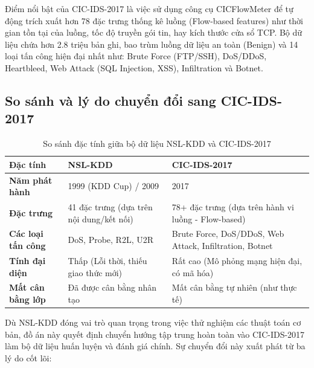 \documentclass[../DoAn.tex]{subfiles}
\begin{document}
Điểm nổi bật của CIC-IDS-2017 là việc sử dụng công cụ CICFlowMeter để tự động trích xuất hơn 78 đặc trưng thống kê luồng (Flow-based features) như thời gian tồn tại của luồng, tốc độ truyền gói tin, hay kích thước cửa sổ TCP. Bộ dữ liệu chứa hơn 2.8 triệu bản ghi, bao trùm luồng dữ liệu an toàn (Benign) và 14 loại tấn công hiện đại nhất như: Brute Force (FTP/SSH), DoS/DDoS, Heartbleed, Web Attack (SQL Injection, XSS), Infiltration và Botnet.

\subsection{So sánh và lý do chuyển đổi sang CIC-IDS-2017}

\begin{table}[htbp]
\centering
\caption{So sánh đặc tính giữa bộ dữ liệu NSL-KDD và CIC-IDS-2017}
\label{tab:dataset_comparison}
\begin{tabular}{|p{3.5cm}|p{5cm}|p{5.5cm}|}
\hline
\textbf{Đặc tính} & \textbf{NSL-KDD} & \textbf{CIC-IDS-2017} \\
\hline
\textbf{Năm phát hành} & 1999 (KDD Cup) / 2009 & 2017 \\
\hline
\textbf{Đặc trưng} & 41 đặc trưng (dựa trên nội dung/kết nối) & 78+ đặc trưng (dựa trên hành vi luồng - Flow-based) \\
\hline
\textbf{Các loại tấn công} & DoS, Probe, R2L, U2R & Brute Force, DoS/DDoS, Web Attack, Infiltration, Botnet \\
\hline
\textbf{Tính đại diện} & Thấp (Lỗi thời, thiếu giao thức mới) & Rất cao (Mô phỏng mạng hiện đại, có mã hóa) \\
\hline
\textbf{Mất cân bằng lớp} & Đã được cân bằng nhân tạo & Mất cân bằng tự nhiên (như thực tế) \\
\hline
\end{tabular}
\end{table}

Dù NSL-KDD đóng vai trò quan trọng trong việc thử nghiệm các thuật toán cơ bản, đồ án này quyết định chuyển hướng tập trung hoàn toàn vào CIC-IDS-2017 làm bộ dữ liệu huấn luyện và đánh giá chính. Sự chuyển đổi này xuất phát từ ba lý do cốt lõi:
\end{document}
